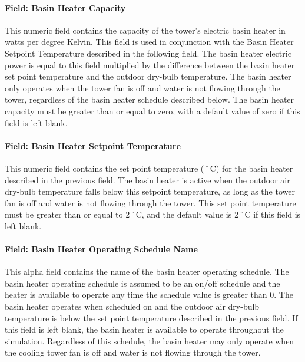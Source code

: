 \paragraph{Field: Basin Heater Capacity}\label{field-basin-heater-capacity-1}

This numeric field contains the capacity of the tower's electric basin heater in watts per degree Kelvin. This field is used in conjunction with the Basin Heater Setpoint Temperature described in the following field. The basin heater electric power is equal to this field multiplied by the difference between the basin heater set point temperature and the outdoor dry-bulb temperature. The basin heater only operates when the tower fan is off and water is not flowing through the tower, regardless of the basin heater schedule described below. The basin heater capacity must be greater than or equal to zero, with a default value of zero if this field is left blank.

\paragraph{Field: Basin Heater Setpoint Temperature}\label{field-basin-heater-setpoint-temperature-1}

This numeric field contains the set point temperature (˚C) for the basin heater described in the previous field. The basin heater is active when the outdoor air dry-bulb temperature falls below this setpoint temperature, as long as the tower fan is off and water is not flowing through the tower. This set point temperature must be greater than or equal to 2˚C, and the default value is 2˚C if this field is left blank.

\paragraph{Field: Basin Heater Operating Schedule Name}\label{field-basin-heater-operating-schedule-name-1}

This alpha field contains the name of the basin heater operating schedule. The basin heater operating schedule is assumed to be an on/off schedule and the heater is available to operate any time the schedule value is greater than 0. The basin heater operates when scheduled on and the outdoor air dry-bulb temperature is below the set point temperature described in the previous field. If this field is left blank, the basin heater is available to operate throughout the simulation. Regardless of this schedule, the basin heater may only operate when the cooling tower fan is off and water is not flowing through the tower.


